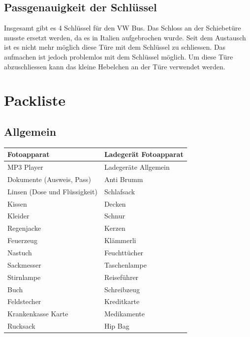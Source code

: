 \subsection{Passgenauigkeit der Schlüssel}
Insgesamt gibt es 4 Schlüssel für den VW Bus.
Das Schloss an der Schiebetüre musste ersetzt werden, da es in Italien aufgebrochen wurde.
Seit dem Austausch ist es nicht mehr möglich diese Türe mit dem Schlüssel zu schliessen.
Das aufmachen ist jedoch problemlos mit dem Schlüssel möglich.
Um diese Türe abzuschliessen kann das kleine Hebelchen an der Türe verwendet werden.

\newpage
\section{Packliste}
\subsection{Allgemein}
\begin{center}
\begin{tabular}{|p{5cm}|p{5cm}|}\hline
Fotoapparat & Ladegerät Fotoapparat \\ \hline
MP3 Player & Ladegeräte Allgemein \\ \hline
Dokumente (Ausweis, Pass) & Anti Brumm \\ \hline
Linsen (Dose und Flüssigkeit) & Schlafsack \\ \hline
Kissen & Decken \\ \hline
Kleider & Schnur \\ \hline
Regenjacke & Kerzen \\ \hline
Feuerzeug & Klämmerli \\ \hline
Nastuch & Feuchttücher \\ \hline
Sackmesser & Taschenlampe \\ \hline
Stirnlampe & Reiseführer \\ \hline
Buch & Schreibzeug \\ \hline
Feldstecher & Kreditkarte \\ \hline
Krankenkasse Karte & Medikamente \\ \hline
Rucksack & Hip Bag \\ \hline
\end{tabular}
\end{center}
\newpage
 
